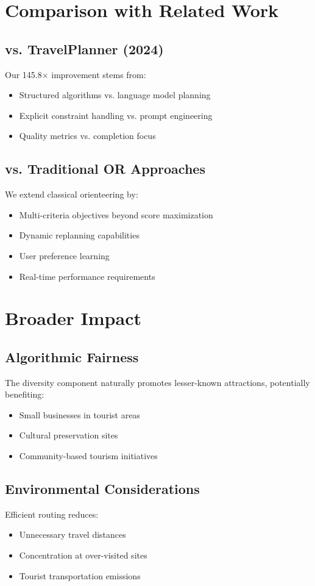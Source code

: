 \section{Comparison with Related Work}

\subsection{vs. TravelPlanner (2024)}
Our 145.8× improvement stems from:
\begin{itemize}
    \item Structured algorithms vs. language model planning
    \item Explicit constraint handling vs. prompt engineering
    \item Quality metrics vs. completion focus
\end{itemize}

\subsection{vs. Traditional OR Approaches}
We extend classical orienteering by:
\begin{itemize}
    \item Multi-criteria objectives beyond score maximization
    \item Dynamic replanning capabilities
    \item User preference learning
    \item Real-time performance requirements
\end{itemize}

\section{Broader Impact}

\subsection{Algorithmic Fairness}
The diversity component naturally promotes lesser-known attractions, potentially benefiting:
\begin{itemize}
    \item Small businesses in tourist areas
    \item Cultural preservation sites
    \item Community-based tourism initiatives
\end{itemize}

\subsection{Environmental Considerations}
Efficient routing reduces:
\begin{itemize}
    \item Unnecessary travel distances
    \item Concentration at over-visited sites
    \item Tourist transportation emissions
\end{itemize}

